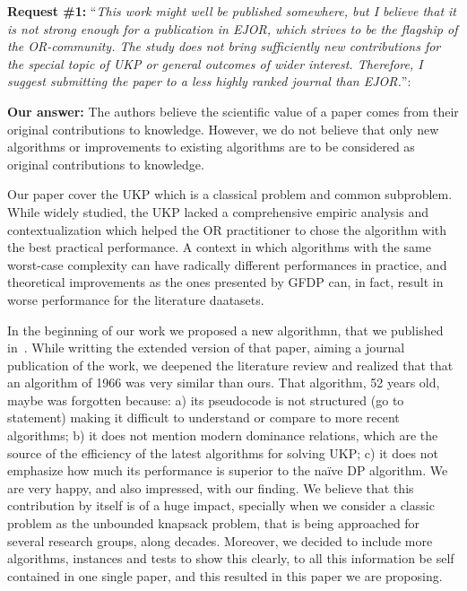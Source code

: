 \documentclass{elsarticle}
\begin{document}
\textbf{Request \#1:} ``\textit{This work might well be published somewhere, but I believe that it is not strong enough for a publication in EJOR, which strives to be the flagship of the OR-community. The study does not bring sufficiently new contributions for the special topic of UKP or general outcomes of wider interest. Therefore, I suggest submitting the paper to a less highly ranked journal than EJOR.}'':

\textbf{Our answer:} 
The authors believe the scientific value of a paper comes from their original contributions to knowledge.
However, we do not believe that only new algorithms or improvements to existing algorithms are to be considered as original contributions to knowledge.

Our paper cover the UKP which is a classical problem and common subproblem.
While widely studied, the UKP lacked a comprehensive empiric analysis and contextualization which helped the OR practitioner to chose the algorithm with the best practical performance.
A context in which algorithms with the same worst-case complexity can have radically different performances in practice, and theoretical improvements as the ones presented by GFDP can, in fact, result in worse performance for the literature daatasets.

In the beginning of our work we proposed a new algorithmn, that we published in~\cite{sea2016}.
While writting the extended version of that paper, aiming a journal publication of the work, we deepened the literature review and realized that that an algorithm of 1966 was very similar than ours.
That algorithm, 52 years old, maybe was forgotten because: a) its pseudocode is not structured (go to statement) making it difficult to understand or compare to more recent algorithms; b) it does not mention modern dominance relations, which are the source of the efficiency of the latest algorithms for solving UKP; c) it does not emphasize how much its performance is superior to the naïve DP algorithm.
We are very happy, and also impressed, with our finding.
We believe that this contribution by itself is of a huge impact, specially when we consider a classic problem as the unbounded knapsack problem, that is being approached for several research groups, along decades. 
Moreover, we decided to include more algorithms, instances and tests to show this clearly, to all this information be self contained in one single paper, and this resulted in this paper we are proposing.
\end{document}
